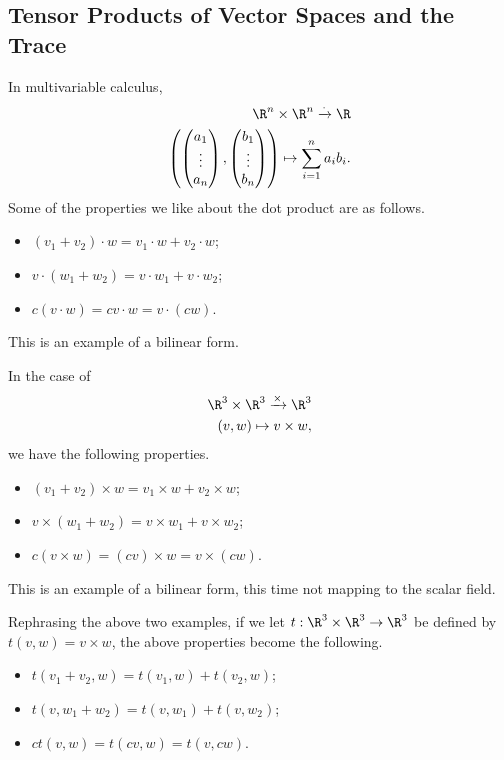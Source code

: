 \documentclass[10pt]{mypackage}
\begin{document}
  \subsection{Tensor Products of Vector Spaces and the Trace}%
  \begin{example}
    In multivariable calculus,
    \begin{align*}
      \R^n\times\R^n \xrightarrow{\cdot}\R\\
      \left( \begin{pmatrix}a_1\\\vdots\\a_n\end{pmatrix}, \begin{pmatrix}b_1\\\vdots\\b_n\end{pmatrix}\right) \mapsto \sum_{i=1}^{n}a_ib_i.
    \end{align*}
    Some of the properties we like about the dot product are as follows.
    \begin{itemize}
      \item $\left(v_1 + v_2\right)\cdot w = v_1\cdot w + v_2\cdot w$;
      \item $v\cdot \left(w_1 + w_2\right) = v\cdot w_1 + v\cdot w_2$;
      \item $c\left(v\cdot w\right) = cv\cdot w = v\cdot \left(cw\right)$.
    \end{itemize}
    This is an example of a bilinear form.
  \end{example}
  \begin{example}
    In the case of
    \begin{align*}
      \R^3\times \R^3\xrightarrow{\times}\R^3\\
      \left(v,w\right) \mapsto v\times w,
    \end{align*}
    we have the following properties.
    \begin{itemize}
      \item $\left(v_1 + v_2\right)\times w = v_1\times w + v_2\times w$;
      \item $v\times \left(w_1 + w_2\right) = v\times w_1 + v\times w_2$;
      \item $c\left(v\times w\right) = \left(cv\right)\times w = v\times \left(cw\right)$.
    \end{itemize}
    This is an example of a bilinear form, this time not mapping to the scalar field.\newline

  Rephrasing the above two examples, if we let $t:\R^3\times\R^3 \rightarrow \R^3$ be defined by $t(v,w) = v\times w$, the above properties become the following.
  \begin{itemize}
    \item $t\left(v_1 + v_2,w\right) = t\left(v_1,w\right) + t\left(v_2,w\right)$;
    \item $t\left(v,w_1 + w_2\right) = t\left(v,w_1\right) + t\left(v,w_2\right)$;
    \item $ct\left(v,w\right) = t\left(cv,w\right) = t\left(v,cw\right)$.
  \end{itemize}
  \end{example}
\end{document}
